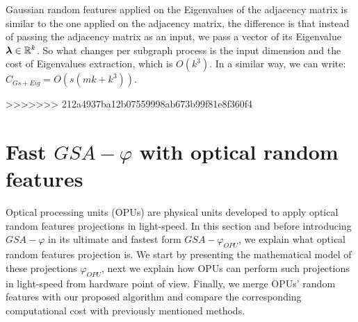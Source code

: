 Gaussian random features applied on the Eigenvalues of the adjacency matrix is similar to the one applied on the adjacency matrix, the difference is that instead of passing the adjacency matrix as an input, we pass a vector of its Eigenvalue $\boldsymbol{\lambda}\in\mathbb{R}^k$. So what changes per subgraph process is the input dimension and the cost of Eigenvalues extraction, which is $O(k^3)$. In a similar way, we can write: $C_{Gs+Eig}=O(s(mk+k^3))$.

>>>>>>> 212a4937ba12b07559998ab673b99f81e8f360f4


\section{Fast $GSA-\varphi$ with optical random features}
\label{section:OPU}
Optical processing units (OPUs) are physical units developed to apply optical random features projections in light-speed. In this section and before introducing $GSA-\varphi$ in its ultimate and fastest form $GSA-\varphi_{OPU}$, we explain what optical random features projection is. We start by presenting the mathematical model of these projections $\varphi_{OPU}$, next we explain how OPUs can perform such projections in light-speed from hardware point of view. Finally, we merge OPUs' random features with our proposed algorithm and compare the corresponding computational cost with previously mentioned methods.

